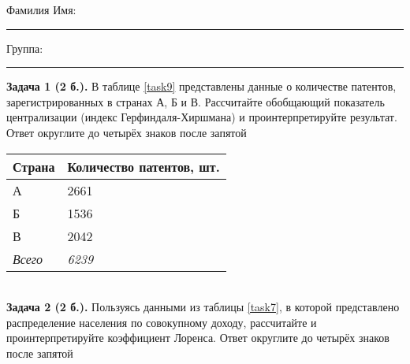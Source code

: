 \documentclass{article}
\begin{document}
\mbox{}

\vspace{-36pt}

\begin{center}
	\begin{tcolorbox}[colback=white, boxrule=0.20ex, sharp corners = all, height=25pt, colframe=black, valign=top]
		\begin{center}
			Фамилия Имя:\hspace{1.5pt}\rule{190pt}{0pt}\hspace{50pt}Группа:\hspace{1.5pt}\rule{60pt}{0pt}
		\end{center}
	\end{tcolorbox}
\end{center}
\vspace{3pt}

\textbf{Задача 1 (2 б.).} В таблице \ref{task9} представлены данные о количестве патентов, зарегистрированных в странах А, Б и В. Рассчитайте обобщающий показатель централизации (индекс Герфиндаля-Хиршмана) и проинтерпретируйте результат. Ответ округлите до четырёх знаков после запятой\\

\begin{minipage}{\textwidth}
\centering
\begin{tabularx}{0.4\textwidth}{YY}
\toprule
\textbf{Страна} & \textbf{Количество патентов, шт.} \\
\midrule
А & 2661 \\

Б & 1536 \\

В & 2042 \\
\addlinespace
\textit{Всего} & \textit{6239} \\
\bottomrule
\end{tabularx}
\label{task9}
\end{minipage} \\[35pt]

\textbf{Задача 2 (2 б.).} Пользуясь данными из таблицы \ref{task7}, в которой представлено распределение населения по совокупному доходу, рассчитайте и проинтерпретируйте коэффициент Лоренса. Ответ округлите до четырёх знаков после запятой\\
\end{document}
